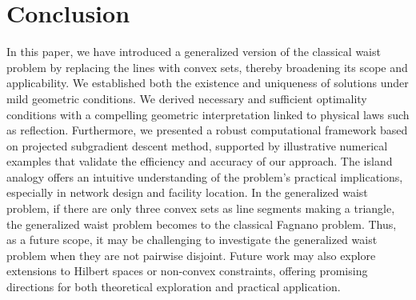 \documentclass[12pt]{article}
\theoremstyle{plain}
\theoremstyle{definition}
\begin{document}
\section{Conclusion}\label{conclusion}	

In this paper, we have introduced a generalized version of the classical waist problem by replacing the lines with convex sets, thereby broadening its scope and applicability. We established both the existence and uniqueness of solutions under mild geometric conditions. We derived necessary and sufficient optimality conditions with a compelling geometric interpretation linked to physical laws such as reflection. Furthermore, we presented a robust computational framework based on projected subgradient descent method, supported by illustrative numerical examples that validate the efficiency and accuracy of our approach. The island analogy offers an intuitive understanding of the problem's practical implications, especially in network design and facility location. In the generalized waist problem, if there are only three convex sets as line segments making a triangle, the generalized waist problem becomes to the classical Fagnano problem. Thus, as a future scope, it may be challenging to investigate the generalized waist problem when they are not pairwise disjoint. Future work may also explore extensions to Hilbert spaces or non-convex constraints, offering promising directions for both theoretical exploration and practical application.






























	
	
	
	
	
	
	
 



		
\end{document}
